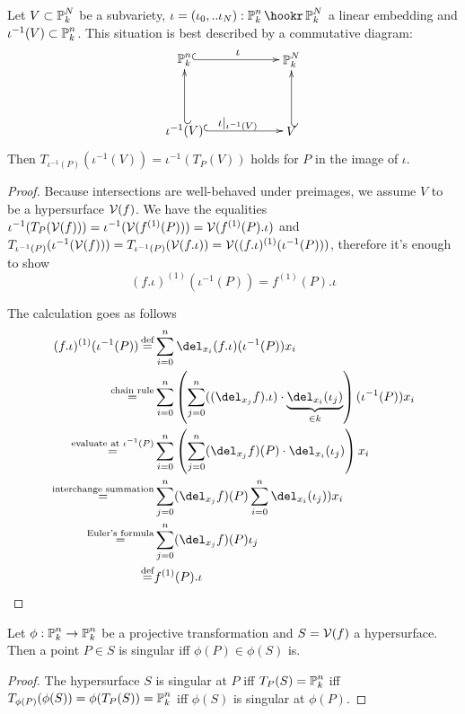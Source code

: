 \begin{proposition} \label{corollaryTangentPullback}
Let $V\subset \operatorname{\mathbb P}^N_k$ be a subvariety, $\iota = (\iota_0,..\iota_N): \proj^n_k \hookr \proj^N_k$ a linear embedding and $\iota^{-1}(V) \subset \operatorname{\mathbb P}^n_k$. This situation is best described by a commutative diagram:
\begin{equation}
\begin{xy}
(0,20)*+{\proj^n_k}="pn";
(30,20)*+{\proj^N_k}="pN";
(0,0)*+{\iota^{-1}(V)}="iv";
(30,0)*+{V}="v";
{\ar@{^{(}->} "pn";"pN"}?*!/_2mm/{\iota};
{\ar@{^{(}->} "iv";"v"}?*!/_2mm/{\iota|_{\iota^{-1}(V)}};
{\ar@{_{(}->} "iv";"pn"};
{\ar@{_{(}->} "v";"pN"};
\end{xy}
\end{equation}
Then $T_{\iota^{-1}(P)}(\iota^{-1}(V)) = \iota^{-1}(T_P(V)) $ holds for $P$ in the image of $\iota$.
\end{proposition}
\begin{proof}
Because intersections are well-behaved under preimages, we assume $V$ to be a hypersurface $\operatorname{\mathcal V}(f)$.
We have the equalities $\iota^{-1}(T_P(\operatorname{\mathcal V}(f))) = \iota^{-1}(\operatorname{\mathcal V}(f^{(1)}(P))) = \operatorname{\mathcal V}(f^{(1)}(P).\iota)$ and $T_{\iota^{-1}(P)}(\iota^{-1}(\operatorname{\mathcal V}(f))) = T_{\iota^{-1}(P)}(\operatorname{\mathcal V}(f.\iota)) = \operatorname{\mathcal V}((f.\iota)^{(1)}(\iota^{-1}(P)))$, therefore it's enough to show
\begin{equation}
(f.\iota)^{(1)}(\iota^{-1}(P))
=
f^{(1)}(P).\iota
\end{equation}

The calculation goes as follows
\begin{align}
(f.\iota)^{(1)}(\iota^{-1}(P))
  \defeq& \sum_{i=0}^n \del_{x_i}(f.\iota)(\iota^{-1}(P))x_i
\\\overset{\text{chain rule}}=& \sum_{i=0}^n \left(\sum_{j=0}^n ((\del_{x_j}f).\iota) \cdot \underset{\in k}{\underbrace{\del_{x_i}(\iota_j)}}\right)(\iota^{-1}(P))x_i
\\\overset{\text{evaluate at }\iota^{-1}(P)}=& \sum_{i=0}^n \left(\sum_{j=0}^n (\del_{x_j}f)(P) \cdot \del_{x_i}(\iota_j)\right)x_i
\\\overset{\text{interchange summation}}=& \sum_{j=0}^n (\del_{x_j}f)(P) \sum_{i=0}^n \del_{x_i}(\iota_j))x_i
\\\overset{\text{Euler's formula}}=& \sum_{j=0}^n (\del_{x_j}f)(P) \iota_j
\\\defeq& f^{(1)}(P).\iota
\end{align}
\end{proof}

\begin{corollary}
Let $\phi : \operatorname{\mathbb P}^n_k \to \operatorname{\mathbb P}^n_k$ be a projective transformation and $S = \operatorname{\mathcal V}(f)$ a hypersurface.
Then a point $P \in S$ is singular iff $\phi(P) \in \phi(S)$ is.
\end{corollary}
\begin{proof}
The hypersurface $S$ is singular at $P$ iff $T_P(S) = \operatorname{\mathbb P}^n_k$ iff $T_{\phi(P)}(\phi(S)) = \phi(T_P(S)) = \operatorname{\mathbb P}^n_k$ iff $\phi(S)$ is singular at $\phi(P)$.
\end{proof}


